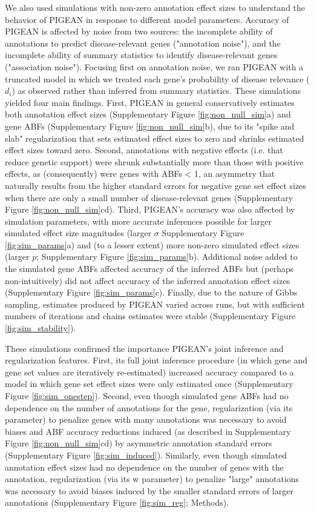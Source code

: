 We also used simulations with non-zero annotation effect sizes to understand the behavior of PIGEAN in response to different model parameters. Accuracy of PIGEAN is affected by noise from two sources: the incomplete ability of annotations to predict disease-relevant genes ("annotation noise"), and the incomplete ability of summary statistics to identify disease-relevant genes ("association noise"). Focusing first on annotation noise, we ran PIGEAN with a truncated model in which we treated each gene's probability of disease relevance ($d_i$) as observed rather than inferred from summary statistics. These simulations yielded four main findings. First, PIGEAN in general conservatively estimates both annotation effect sizes (Supplementary Figure \ref{fig:non_null_sim}a) and gene ABFs (Supplementary Figure \ref{fig:non_null_sim}b), due to its "spike and slab" regularization that sets estimated effect sizes to zero and shrinks estimated effect sizes toward zero. Second, annotations with negative effects (i.e. that reduce genetic support) were shrunk substantially more than those with positive effects, as (consequently) were genes with ABFs < 1, an asymmetry that naturally results from the higher standard errors for negative gene set effect sizes when there are only a small number of disease-relevant genes (Supplementary Figure \ref{fig:non_null_sim}cd). Third, PIGEAN's accuracy was also affected by simulation parameters, with more accurate inferences possible for larger simulated effect size magnitudes (larger $\sigma$ Supplementary Figure \ref{fig:sim_params}a) and (to a lesser extent) more non-zero simulated effect sizes (larger $p$; Supplementary Figure \ref{fig:sim_params}b). Additional noise added to the simulated gene ABFs affected accuracy of the inferred ABFs but (perhaps non-intuitively) did not affect accuracy of the inferred annotation effect sizes (Supplementary Figure \ref{fig:sim_params}c). Finally, due to the nature of Gibbs sampling, estimates produced by PIGEAN varied across runs, but with sufficient numbers of iterations and chains estimates were stable (Supplementary Figure \ref{fig:sim_stability}).

These simulations confirmed the importance PIGEAN's joint inference and regularization features. First, its full joint inference procedure (in which gene and gene set values are iteratively re-estimated) increased accuracy compared to a model in which gene set effect sizes were only estimated once (Supplementary Figure \ref{fig:sim_onestep}). Second, even though simulated gene ABFs had no dependence on the number of annotations for the gene, regularization (via its  parameter) to penalize genes with many annotations was necessary to avoid biases and ABF accuracy reductions induced (as described in Supplementary Figure \ref{fig:non_null_sim}cd) by asymmetric annotation standard errors (Supplementary Figure \ref{fig:sim_induced}). Similarly, even though simulated annotation effect sizes had no dependence on the number of genes with the annotation, regularization (via its w parameter) to penalize "large" annotations was necessary to avoid biases induced by the smaller standard errors of larger annotations (Supplementary Figure \ref{fig:sim_reg}; Methods).

